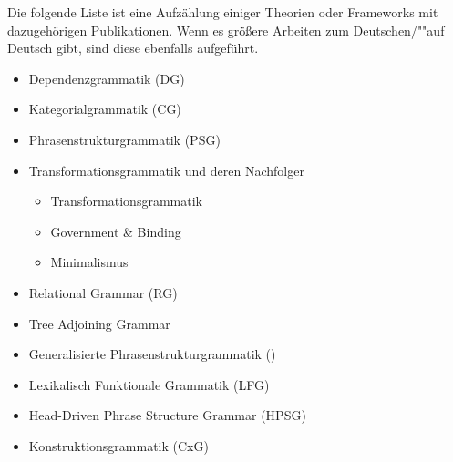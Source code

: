 Die folgende Liste ist eine Aufzählung einiger Theorien oder Frameworks mit dazugehörigen
Publikationen. Wenn es größere Arbeiten zum Deutschen/""auf Deutsch gibt, sind diese ebenfalls
aufgeführt.
\begin{itemize}
\item Dependenzgrammatik (DG)\\\citep{Kern1884a-u,Tesniere59a-u,Tesniere2015a-u,HB69a-u,HB98a,Kunze75a-u,Hudson90a-u,Weber92a,Heringer96a-u}\nocite{Tesniere80a-u}
\item Kategorialgrammatik (CG)\\
\citep*{Ajdukiewicz35a-u,Montague74b-u,Dowty79a,BFZ97a,Steedman2000a-u}
\item Phrasenstrukturgrammatik (PSG)\nocite{Bloomfield33a-u}\\
      \citep*{BHPS61a} %
\item Transformationsgrammatik und deren Nachfolger
      \begin{itemize}
      \item Transformationsgrammatik\\\citep{Chomsky57a,Bierwisch63a}
      \item Government \& Binding\\\citep{Chomsky81a,SS88a,Grewendorf88a}
      \item Minimalismus\\\citep{Chomsky95a-u,Grewendorf2002a}
      \end{itemize}
\item Relational Grammar (RG)\\
      \citep{Perlmutter83a-ed}
\item Tree Adjoining Grammar\\
      \citep*{JLT75a-u,Joshi87a-u,JS97a}      
\item Generalisierte Phrasenstrukturgrammatik (\gpsg)\\
      \citep*{GKPS85a}
\item Lexikalisch Funktionale Grammatik (LFG)\\
      \citep{Bresnan82a-ed,Bresnan2001a,BF96a-ed,Berman2003a}
\item Head-Driven Phrase Structure Grammar (HPSG)\\\citep*{ps,ps2,Kiss95b,Sag97a,Mueller99a,Mueller2002b,HPSGHandbook}
\item Konstruktionsgrammatik (CxG)\\\citep*{FKoC88a,KF99a,Goldberg95a,Goldberg2006a,FS2006a-ed}
\end{itemize}

